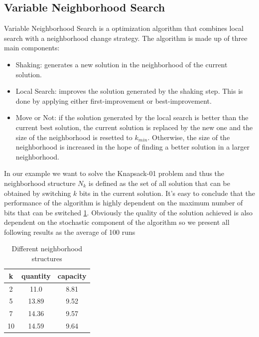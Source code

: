 \subsection{Variable Neighborhood Search}
Variable Neighborhood Search is a optimization algorithm that combines local search with a neighborhood change strategy. The algorithm is made up of three main components:
\begin{itemize}
    \item Shaking: generates a new solution in the neighborhood of the current solution.
    \item Local Search: improves the solution generated by the shaking step. This is done by applying either first-improvement or best-improvement.
    \item Move or Not: if the solution generated by the local search is better than the current best solution, the current solution is replaced by the new one and the size of the neighborhood is resetted to $k_{min}$. Otherwise, the size of the neighborhood is increased in the hope of finding a better solution in a larger neighborhood.
\end{itemize}

In our example we want to solve the Knapsack-01 problem and thus the neighborhood structure $N_k$ is defined as the set of all solution that can be obtained by switching $k$ bits in the current solution. It's easy to conclude that the performance of the algorithm is highly dependent on the maximum number of bits that can be switched \ref{tab:neighborhood}. Obviously the quality of the solution achieved is also dependent on the stochastic component of the algorithm so we present all following results as the average of 100 runs
\begin{table}[H]
    \centering
    \begin{tabular}{c||c |c}
        k  & quantity & capacity \\ \hline
        2  & 11.0     & 8.81     \\
        5  & 13.89    & 9.52     \\
        7  & 14.36    & 9.57     \\
        10 & 14.59    & 9.64     \\
    \end{tabular}
    \caption{Different neighborhood structures}
    \label{tab:neighborhood}
\end{table}


